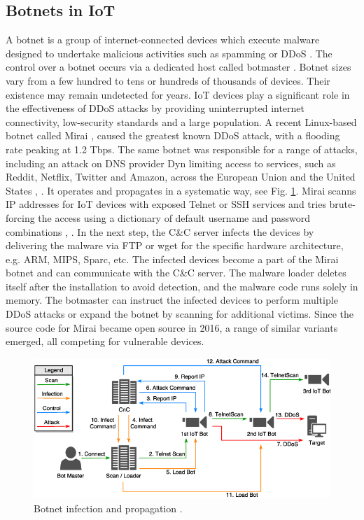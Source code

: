 \documentclass[conference, 11pt]{IEEEtran}
\begin{document}
    \subsection{Botnets in IoT}
    A botnet is a group of internet-connected devices which execute malware designed to undertake malicious activities such as spamming or DDoS \cite{article:6}.
    The control over a botnet occurs via a dedicated host called botmaster \cite{article:6}.
    Botnet sizes vary from a few hundred to tens or hundreds of thousands of devices.
    Their existence may remain undetected for years.
    IoT devices play a significant role in the effectiveness of DDoS attacks by providing uninterrupted internet connectivity, low-security standards and a large population.
    A recent Linux-based botnet called Mirai \cite{article:16}, \cite{article:6} caused the greatest known DDoS attack, with a flooding rate peaking at 1.2 Tbps.
    The same botnet was responsible for a range of attacks, including an attack on DNS provider Dyn limiting access to services, such as Reddit, Netflix, Twitter and Amazon, across the European Union and the United States \cite{article:8}, \cite{article:16}.
    It operates and propagates in a systematic way, see Fig. \ref{fig:mirai}.
    Mirai scanns IP addresses for IoT devices with exposed Telnet or SSH services and tries brute-forcing the access using a dictionary of default username and password combinations \cite{article:8}, \cite{article:6}.
    In the next step, the C\&C server infects the devices by delivering the malware via FTP or wget for the specific hardware architecture, e.g. ARM, MIPS, Sparc, etc.
    The infected devices become a part of the Mirai botnet and can communicate with the C\&C server.
    The malware loader deletes itself after the installation to avoid detection, and the malware code runs solely in memory.
    The botmaster can instruct the infected devices to perform multiple DDoS attacks or expand the botnet by scanning for additional victims.
    Since the source code for Mirai became open source in 2016, a range of similar variants emerged, all competing for vulnerable devices.

    \begin{figure}[htbp]
        \centerline{\includegraphics[width=\linewidth]{figures/botnet.png}}
        \caption{Botnet infection and propagation \cite{article:15}.}
        \label{fig:mirai}
    \end{figure}
\end{document}
